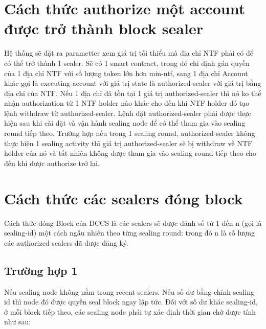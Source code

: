 \documentclass[12pt]{amsart}
\begin{document}
\begin{multicols}{2}
\section{Cách thức authorize một account được trở thành block sealer}
Hệ thống sẽ đặt ra parametter xem giá trị tối thiểu mà địa chỉ NTF phải có để có thể trở thành 1 sealer. Sẽ có 1 smart contract, trong đó chỉ định gán quyền của 1 địa chỉ NTF với số lượng token lớn hơn min-ntf, sang 1 địa chỉ Account khác gọi là executing-account với giá trị state là authorized-sealer với giá trị bằng địa chỉ của NTF. Nếu 1 địa chỉ đã tồn tại 1 giá trị authorized-sealer thì nó ko thể nhận authorization từ 1 NTF holder nào khác cho đến khi NTF holder đó tạo lệnh withdraw từ authorized-sealer. Lệnh đặt authorized-sealer phải được thực hiện sau khi cài đặt và vận hành sealing node để có thể tham gia vào sealing round tiếp theo. Trường hợp nếu trong 1 sealing round, authorized-sealer không thực hiện 1 sealing activity thì giá trị authorized-sealer sẽ bị withdraw về NTF holder của nó và tất nhiên không được tham gia vào sealing round tiếp theo cho đến khi được authorize trở lại.

\section{Cách thức các sealers đóng block}
Cách thức đóng Block của DCCS là các sealers sẽ được đánh số từ 1 đến n (gọi là sealing-id) một cách ngẫu nhiên theo từng sealing round: trong đó n là số lượng các authorized-sealers đã được đăng ký.

\subsection{Trường hợp 1} Nếu sealing node không nằm trong recent sealers. Nếu số dư bằng chính sealing-id thì node đó được quyền seal block ngay lập tức. Đối với số dư khác sealing-id, ở mỗi block tiếp theo, các sealing node phải tự xác định thời gian chờ được tính như sau:




\end{multicols}
\end{document}
